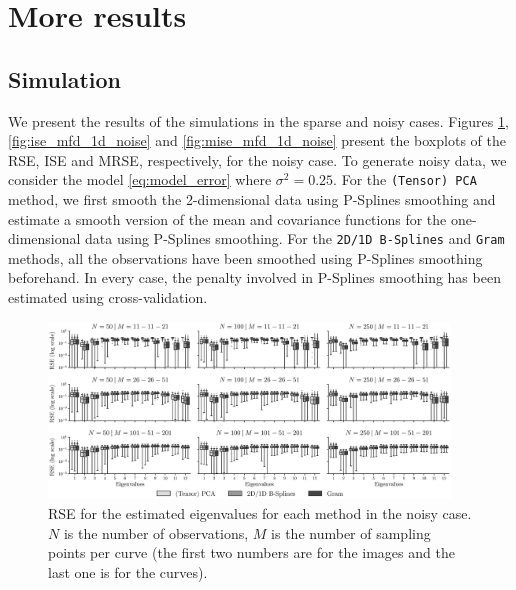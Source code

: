\section{More results} %
\label{sec:more_results}


\subsection{Simulation} %
\label{sub:simulation}

We present the results of the simulations in the sparse and noisy cases. Figures \ref{fig:logAE_mfd_1d_noise}, \ref{fig:ise_mfd_1d_noise} and \ref{fig:mise_mfd_1d_noise} present the boxplots of the RSE, ISE and MRSE, respectively, for the noisy case. To generate noisy data, we consider the model \eqref{eq:model_error} where $\sigma^2 = 0.25$. For the \texttt{(Tensor) PCA} method, we first smooth the 2-dimensional data using P-Splines smoothing and estimate a smooth version of the mean and covariance functions for the one-dimensional data using P-Splines smoothing. For the \texttt{2D/1D B-Splines} and \texttt{Gram} methods, all the observations have been smoothed using P-Splines smoothing beforehand. In every case, the penalty involved in P-Splines smoothing has been estimated using cross-validation.

\begin{figure}
    \centering
    \includegraphics[width=0.95\textwidth]{figures/AE_noise.eps}
    \caption{RSE for the estimated eigenvalues for each method in the noisy case. $N$ is the number of observations, $M$ is the number of sampling points per curve (the first two numbers are for the images and the last one is for the curves).}
    \label{fig:logAE_mfd_1d_noise}
\end{figure}

